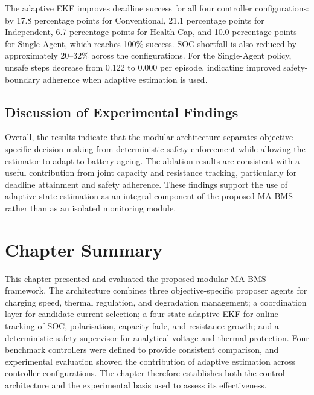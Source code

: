 The adaptive EKF improves deadline success for all four controller configurations: by 17.8 percentage points for Conventional, 21.1 percentage points for Independent, 6.7 percentage points for Health Cap, and 10.0 percentage points for Single Agent, which reaches 100\% success. SOC shortfall is also reduced by approximately 20--32\% across the configurations. For the Single-Agent policy, unsafe steps decrease from 0.122 to 0.000 per episode, indicating improved safety-boundary adherence when adaptive estimation is used.

\subsection{Discussion of Experimental Findings}

Overall, the results indicate that the modular architecture separates objective-specific decision making from deterministic safety enforcement while allowing the estimator to adapt to battery ageing. The ablation results are consistent with a useful contribution from joint capacity and resistance tracking, particularly for deadline attainment and safety adherence. These findings support the use of adaptive state estimation as an integral component of the proposed MA-BMS rather than as an isolated monitoring module.

\section{Chapter Summary}
\label{sec:ch5_summary}

This chapter presented and evaluated the proposed modular MA-BMS framework. The architecture combines three objective-specific proposer agents for charging speed, thermal regulation, and degradation management; a coordination layer for candidate-current selection; a four-state adaptive EKF for online tracking of SOC, polarisation, capacity fade, and resistance growth; and a deterministic safety supervisor for analytical voltage and thermal protection. Four benchmark controllers were defined to provide consistent comparison, and experimental evaluation showed the contribution of adaptive estimation across controller configurations. The chapter therefore establishes both the control architecture and the experimental basis used to assess its effectiveness.